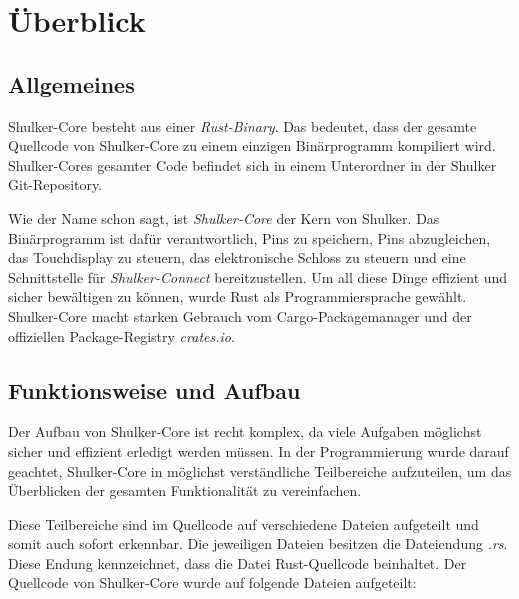 \lstset{language=rust}
\chapter{Überblick}
\section{Allgemeines}
Shulker-Core besteht aus einer \textit{Rust-Binary}. Das bedeutet, dass der gesamte Quellcode von Shulker-Core zu einem einzigen
Binärprogramm kompiliert wird. Shulker-Cores gesamter Code befindet sich in einem Unterordner in der Shulker Git-Repository.

Wie der Name schon sagt, ist \textit{Shulker-Core} der Kern von Shulker. Das Binärprogramm ist dafür verantwortlich,
Pins zu speichern, Pins abzugleichen, das Touchdisplay zu steuern, das elektronische Schloss zu steuern und eine Schnittstelle
für \textit{Shulker-Connect} bereitzustellen. Um all diese Dinge effizient und sicher bewältigen zu können, wurde Rust als
Programmiersprache gewählt. Shulker-Core macht starken Gebrauch vom Cargo-Packagemanager und der offiziellen Package-Registry \textit{crates.io}.

\section{Funktionsweise und Aufbau}
Der Aufbau von Shulker-Core ist recht komplex, da viele Aufgaben möglichst sicher und effizient erledigt werden müssen.
In der Programmierung wurde darauf geachtet, Shulker-Core in möglichst verständliche Teilbereiche aufzuteilen, um das Überblicken
der gesamten Funktionalität zu vereinfachen.

Diese Teilbereiche sind im Quellcode auf verschiedene Dateien aufgeteilt und somit auch sofort erkennbar. Die jeweiligen Dateien besitzen die
Dateiendung \textit{.rs}. Diese Endung kennzeichnet, dass die Datei Rust-Quellcode beinhaltet. Der Quellcode von Shulker-Core wurde
auf folgende Dateien aufgeteilt:

